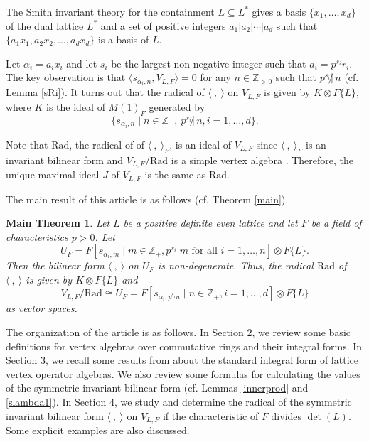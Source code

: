 \documentclass[12pt]{article}
\def\ZZ{{\mathbb Z}}
\newtheorem{mainthm}{Main Theorem}
\begin{document}
The Smith invariant theory for the containment  $L\subseteq L^*$ gives a basis $\{x_1, \dots, x_d\}$ of the dual lattice $L^*$ and a set of positive integers $a_1| a_2|\cdots| a_d$ such that 
$\{a_1x_1, a_2x_2, \dots, a_dx_d\}$ is a basis of $L$.


Let $\alpha_i=a_ix_i$ and let $s_i$ be the largest non-negative integer such that $a_i=p^{s_i} r_i$.  The key observation is that $
\langle s_{\alpha_i,n}, V_{L, F} \rangle =0  $   
for any $n\in \ZZ_{>0}$ such that ${p^{s_i}\not|\,n}$ (cf. Lemma \ref{sRi}).   
It turns out that the radical of $\langle\ , \ \rangle$ on $V_{L,F}$ is given by 
$K\otimes F\{L\}$, where $K$ is the ideal of $M(1)_F$ generated by 
$$\{ s_{\alpha_i,n}\mid n\in \ZZ_+,\ p^{s_i}\not|\, n, i=1,\dots,d\}.$$  



Note that $\mathrm{Rad}$, the radical of  of $\langle\ , \ \rangle_F$,  is an ideal of $V_{L,F}$ since $\langle \ , \ \rangle_F$ is an invariant bilinear form and $V_{L,F}/\mathrm{Rad}$ is a simple vertex algebra \cite{Li}.  Therefore, the unique maximal ideal $J$ of $V_{L,F}$ is the same as $\mathrm{Rad}$.  

The main result of this article is as follows (cf. Theorem \ref{main}). 

\begin{mainthm}\label{mainthm}
Let $L$ be a positive definite even lattice and let $F$ be a field of characteristics $p>0$. 
Let 
\[
U_F = F[s_{\alpha_i, m}\mid    m\in \ZZ_+,  p^{s_i}| m \text{ for all }i=1, \dots, n] \otimes F\{L\}.  
\]
Then  the bilinear form $\langle \ ,  \ \rangle$ on $U_F$ is non-degenerate.  Thus, the radical $\mathrm{Rad}$ of 
$\langle \  ,  \ \rangle$ is given by $K\otimes F\{L\}$  and 
\[
V_{L,F}/ \mathrm{Rad}\cong U_F= F[ s_{\alpha_i, p^{s_i} n}\mid  n\in \ZZ_+, i=1, \dots,d] \otimes F\{L\} 
\]
as vector spaces. 
\end{mainthm}



The organization of the article is as follows. In Section 2, we review some basic definitions for vertex algebras over commutative rings and their integral forms. In Section 3, we recall some results from \cite{borcherds,ivoa,Pro} about the standard integral form 
of lattice vertex operator algebras. We also review  some formulas for calculating the values of the symmetric invariant bilinear form (cf. Lemmas \ref{innerprod} and \ref{slambda1}).   
In Section 4, we study and determine the radical of the symmetric invariant bilinear form $\langle\ ,\ \rangle$ on $V_{L,F}$ if the characteristic of $F$ divides $\det(L)$.
Some explicit examples are also discussed. 
\end{document}
